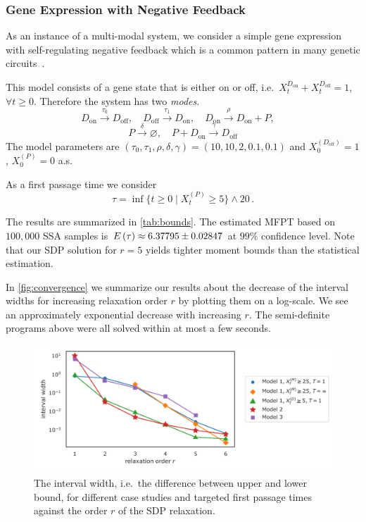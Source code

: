 \subsubsection{Gene Expression with Negative Feedback}
As an instance of a multi-modal system, we consider a simple gene expression with self-regulating
negative feedback which is a common pattern in many genetic circuits~\cite{stekel2008strong}.

\begin{model}\label{model:gexpr}
This model consists of a gene state that is either on or off, i.e.\ $X^{D_{\text{on}}}_t
+X^{D_{\text{off}}}_t = 1$, $\forall t\geq 0$. Therefore the system has two \emph{modes}.
$$
D_{\text{on}} \xrightarrow{\tau_{0}} D_{\text{off}}, \quad
D_{\text{off}} \xrightarrow{\tau_{1}} D_{\text{on}}, \quad
D_{\text{on}} \xrightarrow{\rho} D_{\text{on}} + P, \quad
$$
$$
P\xrightarrow{\delta}\varnothing,\quad
P + D_{\text{on}} \xrightarrow{\gamma} D_{\text{off}}
$$
The model parameters are $(\tau_0,\tau_1,\rho,\delta,\gamma)=(10,10,2,0.1,0.1)$ and
$X_0^{(D_{\text{off}})}=1$, $X_0^{(P)}=0$ a.s.
\end{model}

As a first passage time we consider $$\tau=\inf\{t\geq 0\mid X_t^{(P)} \geq
5\}\land 20\,.$$


The results are summarized in \autoref{tab:bounds}.
The estimated MFPT based on $100,\!000$
SSA samples is ${E}\left(\tau\right)\approx 6.37795\pm0.02847$ at $99\%$ confidence level.
Note that our SDP solution for $r=5$ yields tighter moment bounds than
the statistical estimation.%


In \autoref{fig:convergence} we summarize our results about the decrease of the interval widths for increasing relaxation order $r$ by plotting them on a log-scale.
We see an approximately exponential decrease with increasing $r$.
The semi-definite programs above were all solved within at most a few seconds.
\begin{figure}[t]
    \centering
    \includegraphics[scale=0.65]{gfx/convergence.pdf}
    \caption{The interval width, i.e.\ the difference between upper and lower bound,
    for different case studies and targeted first passage times against the order $r$
    of the SDP relaxation.\label{fig:convergence}}
\end{figure}



